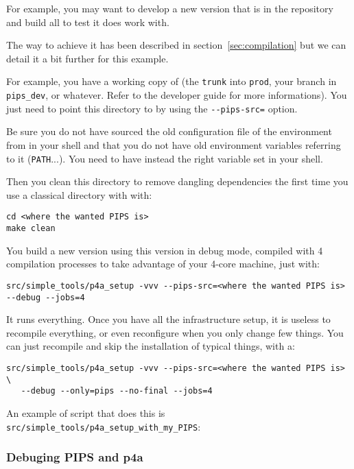 \documentclass[a4paper]{article}
\begin{document}
For example, you may want to develop a new \Apips version that is in the
\Acri{} \Asvn repository and build all \Apfa to test it does work with.

The way to achieve it has been described in section~\ref{sec:compilation}
but we can detail it a bit further for this example.

For example, you have a \Asvn working copy of \Apips (the \texttt{trunk}
into \texttt{prod}, your branch in \verb|pips_dev|, or whatever. Refer
to the \Apips developer guide for more informations). You just need to
point this directory to \Apfa by using the \verb|--pips-src=| option.

Be sure you do not have sourced the old configuration file of the \Apips
\Asvn environment from \Acri in your shell and that you do not have old
environment variables referring to it (\verb|PATH|...). You need to have
instead the right \Apfa variable set in your shell.

Then you clean this directory to remove dangling dependencies the first
time you use a classical \Apips directory with \Apfa with:
\begin{verbatim}
cd <where the wanted PIPS is>
make clean
\end{verbatim}

You build a new \Apfa version using this \Apips version in debug mode,
compiled with 4 compilation processes to take advantage of your 4-core
machine, just with:
\begin{verbatim}
src/simple_tools/p4a_setup -vvv --pips-src=<where the wanted PIPS is> --debug --jobs=4
\end{verbatim}

It runs everything. Once you have all the infrastructure setup, it is
useless to recompile everything, or even reconfigure \Apips when you only
change few things. You can just recompile \Apips and skip the installation
of typical \Apfa things, with a:
\begin{verbatim}
src/simple_tools/p4a_setup -vvv --pips-src=<where the wanted PIPS is> \
   --debug --only=pips --no-final --jobs=4
\end{verbatim}

An example of script that does this is
\verb|src/simple_tools/p4a_setup_with_my_PIPS|:



\subsubsection{Debuging PIPS and p4a}
\label{sec:debuging-pips-p4a}
\end{document}
